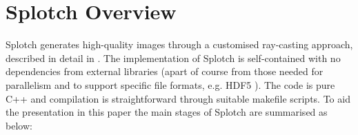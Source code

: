 \documentclass[1p]{elsarticle}
\begin{document}
\section{Splotch Overview}
\label{sec:overview}

Splotch generates high-quality images through a customised ray-casting approach, described in detail in \cite{2008NJPh...10l5006D}.  
The implementation of Splotch is self-contained with no dependencies from external libraries (apart of course from those needed for parallelism and to support specific file formats, e.g. HDF5 \cite{hdf5}). The code is pure C++ and compilation is straightforward through suitable makefile scripts.
To aid the presentation in this paper the main stages of Splotch are summarised as below:
\end{document}
